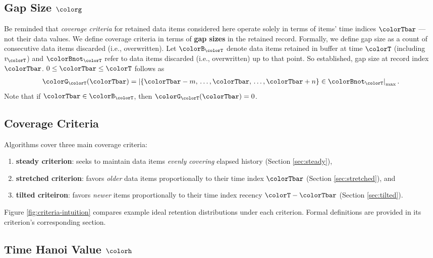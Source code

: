 \subsection{Gap Size $\colorg$}
\label{sec:notation-gapsize}

Be reminded that \textit{coverage criteria} for retained data items considered here operate solely in terms of items' time indices $\colorTbar$ --- not their data values.
We define coverage criteria in terms of \textbf{gap sizes} in the retained record.
Formally, we define gap size as a count of consecutive data items discarded (i.e., overwritten).
Let $\colorB_{\colorT}$ denote data items retained in buffer at time $\colorT$ (including $v_{\colorT}$) and $\colorBnot_{\colorT}$ refer to data items discarded (i.e., overwritten) up to that point.
So established, gap size at record index $\colorTbar$. $0 \leq \colorTbar \leq \colorT$ follows as
\begin{align*}
\colorG_{\colorT}(\colorTbar) = \left| \{\colorTbar - m, \,\ldots, \colorTbar, \,\ldots, \colorTbar+n\} \in \colorBnot_{\colorT} \right|_\mathrm{max}.
\end{align*}
Note that if $\colorTbar \in \colorB_{\colorT}$, then $\colorG_{\colorT}(\colorTbar) = 0$.

\subsection{Coverage Criteria}
\label{sec:notation-coverage}

Algorithms cover three main coverage criteria:
\begin{enumerate}
\item \textbf{steady criterion}: seeks to maintain data items \textit{evenly covering} elapsed history (Section \ref{sec:steady}),
\item \textbf{stretched criterion}: favors \textit{older} data items proportionally to their time index $\colorTbar$ (Section \ref{sec:stretched}), and
\item \textbf{tilted criteiron}: favors \textit{newer} items proportionally to their time index recency $\colorT - \colorTbar$ (Section \ref{sec:tilted}).
\end{enumerate}
Figure \ref{fig:criteria-intuition} compares example ideal retention distributions under each criterion.
Formal definitions are provided in its criterion's corresponding section.

\subsection{Time Hanoi Value $\colorh$}
\label{sec:notation-hanoi}

